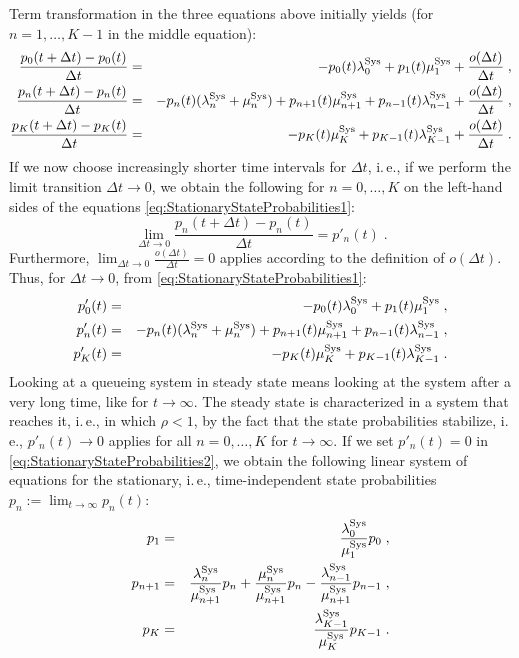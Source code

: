\documentclass[a4paper,11pt,oneside]{article}
\theoremstyle{definition}
\begin{document}
Term transformation in the three equations above initially yields (for $n=1,\ldots,K-1$ in the middle equation):
\begin{eqnarray}
\frac{p_0(t+\Delta t)-p_0(t)}{\Delta t}&=&
-p_0(t)\lambda_0^{\rm Sys}+p_{1}(t)\mu_1^{\rm Sys}+\frac{o(\Delta t)}{\Delta t}\;,
\label{eq:StationaryStateProbabilities1}\\
\frac{p_n(t+\Delta t)-p_n(t)}{\Delta t}&=&
-p_n(t)(\lambda_n^{\rm Sys}+\mu_n^{\rm Sys})+p_{n+1}(t)\mu_{n+1}^{\rm Sys}+p_{n-1}(t)\lambda_{n-1}^{\rm Sys}+\frac{o(\Delta t)}{\Delta t}\;,
\nonumber\\
\frac{p_K(t+\Delta t)-p_K(t)}{\Delta t}&=&
-p_K(t)\mu_K^{\rm Sys}+p_{K-1}(t)\lambda_{K-1}^{\rm Sys}+\frac{o(\Delta t)}{\Delta t}\;.
\nonumber
\end{eqnarray}
If we now choose increasingly shorter time intervals for $\Delta t$, i.\,e., if we perform the limit transition $\Delta t\to0$, we obtain the following for $n=0,\ldots,K$ on the left-hand sides of the equations \eqref{eq:StationaryStateProbabilities1}:
$$
\lim_{\Delta t\to0}\frac{p_n(t+\Delta t)-p_n(t)}{\Delta t}=p'_n(t)\;.
$$
Furthermore, $\lim_{\Delta t\to0}\frac{o(\Delta t)} {\Delta t}=0$ applies according to the definition of $o(\Delta t)$. Thus, for $\Delta t\to0$, from \eqref{eq:StationaryStateProbabilities1}:
\begin{eqnarray}
p'_0(t)&=&
-p_0(t)\lambda_0^{\rm Sys}+p_{1}(t)\mu_1^{\rm Sys}\;,
\nonumber\\
p'_n(t)&=&
-p_n(t)(\lambda_n^{\rm Sys}+\mu_n^{\rm Sys})+p_{n+1}(t)\mu_{n+1}^{\rm Sys}+p_{n-1}(t)\lambda_{n-1}^{\rm Sys}\;,
\label{eq:StationaryStateProbabilities2}\\
p'_K(t)&=&
-p_K(t)\mu_K^{\rm Sys}+p_{K-1}(t)\lambda_{K-1}^{\rm Sys}\;.
\nonumber
\end{eqnarray}
Looking at a queueing system in steady state means looking at the system after a very long time, like for $t\to\infty$. The steady state is characterized in a system that reaches it, i.\,e., in which $\rho<1$, by the fact that the state probabilities stabilize, i.\,e., $p'_n(t)\to0$ applies for all $n=0,\ldots,K$ for $t\to\infty$. If we set $p'_n(t)=0$ in \eqref{eq:StationaryStateProbabilities2}, we obtain the following linear system of equations for the stationary, i.\,e., time-independent state probabilities $p_n:=\lim_{t\to\infty}p_n(t)$:
\begin{eqnarray}
p_1&=&
\frac{\lambda_0^{\rm Sys}}{\mu_1^{\rm Sys}}p_0\;,
\nonumber\\
p_{n+1}&=&
\frac{\lambda_n^{\rm Sys}}{\mu_{n+1}^{\rm Sys}}p_n+\frac{\mu_n^{\rm Sys}}{\mu_{n+1}^{\rm Sys}}p_n-\frac{\lambda_{n-1}^{\rm Sys}}{\mu_{n+1}^{\rm Sys}}p_{n-1}\;,
\label{eq:StationaryStateProbabilities3}\\
p_K&=&
\frac{\lambda_{K-1}^{\rm Sys}}{\mu_K^{\rm Sys}}p_{K-1}\;.
\nonumber
\end{eqnarray}
\end{document}
